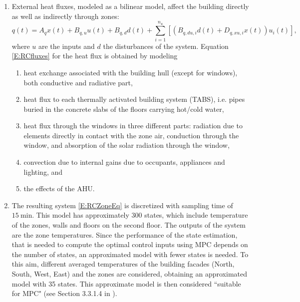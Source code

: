 {\begin{enumerate}
		where $C_a$ and $C_b$ are the heat capacitances of the layers. This is done for each layer of each zone, obtaining the compact representation given in \eqref{E:RCZoneEq}. The thermal parameters are derived from zones geometry and material properties.
	\item External heat fluxes, modeled as a bilinear model, affect the building directly as well as indirectly through zones:
		\begin{equation}\label{E:RCfluxes}
			q(t) = A_q x(t) + B_{q,u}u(t) + B_{q,d}d(t) + \sum_{i=1}^{n_u}{[\left(B_{q,du,i}d(t) + D_{q,xu,i}x(t)\right)u_i(t)]},
		\end{equation}
		where $u$ are the inputs and $d$ the disturbances of the system.
Equation \eqref{E:RCfluxes} for the heat flux is obtained by modeling
	\begin{enumerate}
		\item heat exchange associated with the building hull (except for windows), both conductive and radiative part,
		\item  heat flux to each thermally activated building system (TABS), i.e. pipes buried in the concrete slabs of the floors carrying hot/cold water,
		\item heat flux through the windows in three different parts: radiation due to elements directly in contact with the zone air, conduction through the window, and absorption of the solar radiation through the window,
		\item convection due to internal gains due to occupants, appliances and lighting, and
		\item the effects of the AHU.
	\end{enumerate}
	\item The resulting system \eqref{E:RCZoneEq} is discretized with sampling time of $15\ \mathrm{min}$.
	This model has approximately 300 states, which include temperature of the zones, walls and floors on the second floor.
	The outputs of the system are the zone temperatures.
	Since the performance of the state estimation, that is needed to compute the optimal control inputs using MPC depends on the number of states, an approximated model with fewer states is needed.
	To this aim, different averaged temperatures of the building facades (North, South, West, East) and the zones are considered, obtaining an approximated model with 35 states.
	This  approximate model is then considered ``suitable for MPC" (see Section 3.3.1.4 in \cite{SturzeneggerTR}). 
\end{enumerate}}
	
